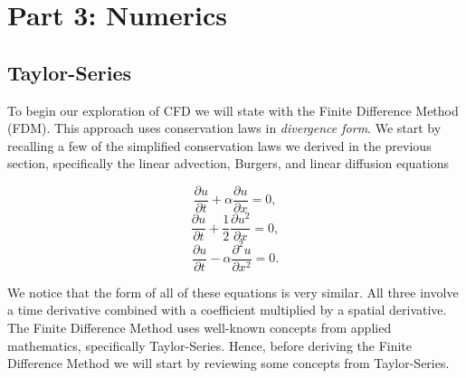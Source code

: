 \part{Part 3: Numerics}


\chapter{Taylor-Series}
To begin our exploration of CFD we will state with the Finite Difference Method (FDM). This approach uses conservation laws in {\it divergence form}. We start by recalling a few of the simplified conservation laws we derived in the previous section, specifically the linear advection, Burgers, and linear diffusion equations
\begin{eqBox}
\begin{equation}
	\frac{\partial u}{\partial t} +  \alpha \frac{\partial u}{\partial x} = 0,
\end{equation}
\begin{equation}
	\frac{\partial u}{\partial t} +  \frac{1}{2} \frac{\partial u^2}{\partial x} = 0,
\end{equation}
\begin{equation}
	\frac{\partial u}{\partial t} - \alpha \frac{\partial^2 u}{\partial x^2} = 0.
\end{equation}
\end{eqBox}
We notice that the form of all of these equations is very similar. All three involve a time derivative combined with a coefficient multiplied by a spatial derivative. The Finite Difference Method uses well-known concepts from applied mathematics, specifically Taylor-Series. Hence, before deriving the Finite Difference Method we will start by reviewing some concepts from Taylor-Series.


